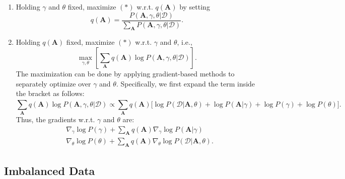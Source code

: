            \begin{enumerate}
                \item Holding $\gamma$ and $\theta$ fixed, maximize $(\ast)$ w.r.t. $q(\bm{A})$ by setting
                    \begin{equation}
                        q(\bm{A}) = \frac{P(\bm{A}, \gamma, \theta | \mathcal{D})}{\sum_{\bm{A}}^{}{P(\bm{A}, \gamma, \theta | \mathcal{D})}}.
                    \end{equation}
                \item Holding $q(\bm{A})$ fixed, maximize $(\ast)$ w.r.t. $\gamma$ and $\theta$, i.e.,
                    \begin{equation}
                        \max_{\gamma, \theta}\left[ \sum_{\bm{A}}^{}{
                            q(\bm{A}) \log P(\bm{A}, \gamma, \theta | \mathcal{D})
                        } \right].
                    \end{equation}
                The maximization can be done by applying gradient-based methods to separately optimize over $\gamma$ and $\theta$.
                Specifically, we first expand the term inside the bracket as follows:
                    \begin{equation}
                        \sum_{\bm{A}}^{}{
                            q(\bm{A}) \log P(\bm{A}, \gamma, \theta | \mathcal{D})
                        } \propto \sum_{\bm{A}}^{}{
                            q(\bm{A}) \Big[  \log P(\mathcal{D} | \bm{A}, \theta) + \log P(\bm{A} | \gamma) + \log P(\gamma) + \log P(\theta) \Big]
                        }.
                    \end{equation}
                Thus, the gradients w.r.t. $\gamma$ and $\theta$ are:
                    \begin{equation}
                        \begin{aligned}
                        & \nabla_\gamma \log P(\gamma) + \sum_{\bm{A}}^{}{q(\bm{A}) \nabla_{\gamma} \log P(\bm{A} | \gamma)}
                         \\
                        & \nabla_\theta \log P(\theta) + \sum_{\bm{A}}^{}{q(\bm{A}) \nabla_\theta \log P(\mathcal{D} | \bm{A}, \theta) }.
                        \end{aligned}
                    \end{equation}
            \end{enumerate}
    
        

\subsection{Imbalanced Data}

